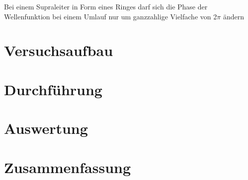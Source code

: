 \documentclass[12pt]{article}
\begin{document}
Bei einem Supraleiter in Form eines Ringes darf sich die Phase der Wellenfunktion bei einem Umlauf nur um ganzzahlige Vielfache von 2$\pi$ ändern
\section{Versuchsaufbau}

\section{Durchführung}

\section{Auswertung}

\section{Zusammenfassung}
\end{document}
